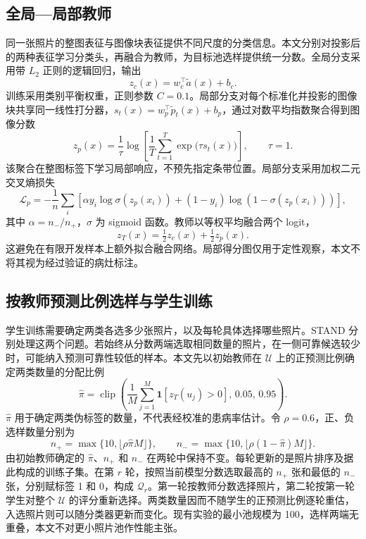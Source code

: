 \documentclass[11pt,a4paper,UTF8,fontset=windows,scheme=plain]{ctexart}
\begin{document}
\subsection{全局—局部教师}
同一张照片的整图表征与图像块表征提供不同尺度的分类信息。本文分别对投影后的两种表征学习分类头，再融合为教师，为目标池选样提供统一分数。全局分支采用带 $L_2$ 正则的逻辑回归，输出
\begin{equation}
z_c(x)=w_c^\top\widetilde a(x)+b_c.
\end{equation}
训练采用类别平衡权重，正则参数 $C=0.1$。局部分支对每个标准化并投影的图像块共享同一线性打分器，$s_t(x)=w_p^\top\widetilde p_t(x)+b_p$，通过对数平均指数聚合得到图像分数
\begin{equation}
z_p(x)=\frac{1}{\tau}\log\left[\frac{1}{T}\sum_{t=1}^{T}\exp\bigl(\tau s_t(x)\bigr)\right],\qquad \tau=1.
\label{eq:mil}
\end{equation}
该聚合在整图标签下学习局部响应，不预先指定条带位置。局部分支采用加权二元交叉熵损失
\begin{equation}
\mathcal L_p=-\frac{1}{n}\sum_i\left[\alpha y_i\log\sigma(z_p(x_i))+(1-y_i)\log(1-\sigma(z_p(x_i)))\right],
\end{equation}
其中 $\alpha=n_-/n_+$，$\sigma$ 为 sigmoid 函数。教师以等权平均融合两个 logit，
\begin{equation}
z_T(x)=\tfrac12 z_c(x)+\tfrac12 z_p(x).
\label{eq:teacher}
\end{equation}
这避免在有限开发样本上额外拟合融合网络。局部得分图仅用于定性观察，本文不将其视为经过验证的病灶标注。

\subsection{按教师预测比例选样与学生训练}
学生训练需要确定两类各选多少张照片，以及每轮具体选择哪些照片。STAND 分别处理这两个问题。若始终从分数两端选取相同数量的照片，在一侧可靠候选较少时，可能纳入预测可靠性较低的样本。本文先以初始教师在 $\mathcal U$ 上的正预测比例确定两类数量的分配比例
\begin{equation}
\widehat\pi=\operatorname{clip}\left(\frac{1}{M}\sum_{j=1}^{M}\mathbf1[z_T(u_j)>0],\,0.05,\,0.95\right).
\end{equation}
$\widehat\pi$ 用于确定两类伪标签的数量，不代表经校准的患病率估计。令 $\rho=0.6$，正、负选样数量分别为
\begin{equation}
n_+=\max\{10,\lfloor\rho\widehat\pi M\rfloor\},\qquad
n_-=\max\{10,\lfloor\rho(1-\widehat\pi)M\rfloor\}.
\label{eq:quota}
\end{equation}
由初始教师确定的 $\widehat\pi$、$n_+$ 和 $n_-$ 在两轮中保持不变。每轮更新的是照片排序及据此构成的训练子集。在第 $r$ 轮，按照当前模型分数选取最高的 $n_+$ 张和最低的 $n_-$ 张，分别赋标签 1 和 0，构成 $\mathcal Q_r$。第一轮按教师分数选择照片，第二轮按第一轮学生对整个 $\mathcal U$ 的评分重新选择。两类数量因而不随学生的正预测比例逐轮重估，入选照片则可以随分类器更新而变化。现有实验的最小池规模为 100，选样两端无重叠，本文不对更小照片池作性能主张。
\end{document}
